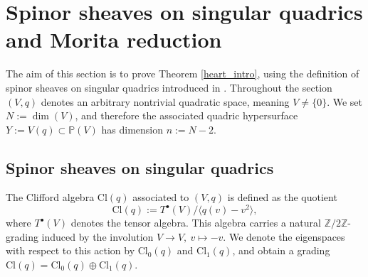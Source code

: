 \documentclass[a4paper, twoside, 11pt]{amsart}
\theoremstyle{definition}
\theoremstyle{remark}
\numberwithin{equation}{theorem}
\newcommand{\evencl}{\mathrm{Cl}_0}
\newcommand{\oddcl}{\mathrm{Cl}_1}
\newcommand{\cl}{\mathrm{Cl}}
\begin{document}
\section{Spinor sheaves on singular quadrics and Morita reduction}\label{spinors_on_singular_quadrics}
The aim of this section is to prove Theorem \ref{heart_intro}, using the definition of spinor sheaves on singular quadrics introduced in \cite{Addington}. Throughout the section $(V,q)$ denotes an arbitrary nontrivial quadratic space, meaning $V \neq \{0\}$. We set $N := \dim(V)$, and therefore the associated quadric hypersurface $Y :=V(q) \subset \mathbb{P}(V)$ has dimension $n:=N-2$.
\subsection{Spinor sheaves on singular quadrics}\label{addington_def} The Clifford algebra $\cl(q)$ associated to $(V,q)$ is defined as the quotient 
\begin{equation}
    \cl(q) := T^{\bullet}(V)/\langle q(v) - v^2 \rangle,
\end{equation}
where $T^{\bullet}(V)$ denotes the tensor algebra. This algebra carries a natural $\mathbb{Z}/2\mathbb{Z}$-grading induced by the involution $V \to V, \ v \mapsto -v$. We denote the eigenspaces with respect to this action by $\evencl(q)$ and $\oddcl(q)$, and obtain a grading $\cl(q) = \evencl(q) \oplus \oddcl(q)$. 
\end{document}
